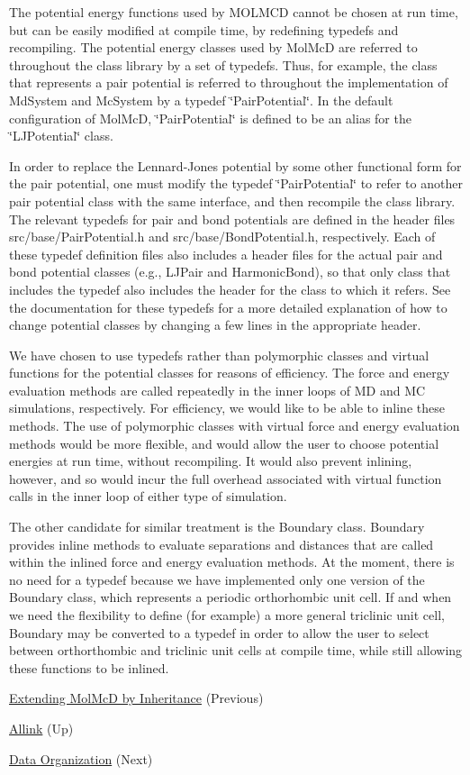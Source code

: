 The potential energy functions used by M\+O\+L\+M\+CD cannot be chosen at run time, but can be easily modified at compile time, by redefining typedefs and recompiling. The potential energy classes used by Mol\+McD are referred to throughout the class library by a set of typedefs. Thus, for example, the class that represents a pair potential is referred to throughout the implementation of Md\+System and Mc\+System by a typedef \char`\"{}\+Pair\+Potential\char`\"{}. In the default configuration of Mol\+McD, \char`\"{}\+Pair\+Potential\char`\"{} is defined to be an alias for the \char`\"{}\+L\+J\+Potential\char`\"{} class.

In order to replace the Lennard-\/\+Jones potential by some other functional form for the pair potential, one must modify the typedef \char`\"{}\+Pair\+Potential\char`\"{} to refer to another pair potential class with the same interface, and then recompile the class library. The relevant typedefs for pair and bond potentials are defined in the header files src/base/\+Pair\+Potential.\+h and src/base/\+Bond\+Potential.\+h, respectively. Each of these typedef definition files also includes a header files for the actual pair and bond potential classes (e.\+g., L\+J\+Pair and Harmonic\+Bond), so that only class that includes the typedef also includes the header for the class to which it refers. See the documentation for these typedefs for a more detailed explanation of how to change potential classes by changing a few lines in the appropriate header.

We have chosen to use typedefs rather than polymorphic classes and virtual functions for the potential classes for reasons of efficiency. The force and energy evaluation methods are called repeatedly in the inner loops of MD and MC simulations, respectively. For efficiency, we would like to be able to inline these methods. The use of polymorphic classes with virtual force and energy evaluation methods would be more flexible, and would allow the user to choose potential energies at run time, without recompiling. It would also prevent inlining, however, and so would incur the full overhead associated with virtual function calls in the inner loop of either type of simulation.

The other candidate for similar treatment is the Boundary class. Boundary provides inline methods to evaluate separations and distances that are called within the inlined force and energy evaluation methods. At the moment, there is no need for a typedef because we have implemented only one version of the Boundary class, which represents a periodic orthorhombic unit cell. If and when we need the flexibility to define (for example) a more general triclinic unit cell, Boundary may be converted to a typedef in order to allow the user to select between orthorthombic and triclinic unit cells at compile time, while still allowing these functions to be inlined. 
\begin{DoxyItemize}
\item \hyperlink{extension_page}{Extending Mol\+McD by Inheritance} (Previous)  
\item \hyperlink{index}{Allink} (Up)  
\item \hyperlink{data_page}{Data Organization} (Next)  
\end{DoxyItemize}